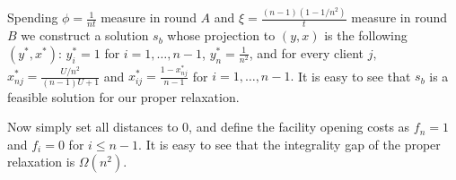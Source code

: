 \documentclass[11pt]{article}
\begin{document}
Spending $\phi=\frac{1}{nt}$ measure in round $A$ and $\xi=\frac{(n-1)(1-1/n^2)}{t}$ 
measure in round $B$ we construct a solution $s_b$ whose projection to $(y,x)$ is the 
following $(y^*,x^*)$:
$y^*_i=1$ for $i=1,\ldots ,n-1$, $y^*_n=\frac{1}{n^2}$, and for every client $j,$ $x^*_{nj}=\frac{U/n^2}{(n-1)U+1}$ and 
$x^*_{ij}=\frac{1-x^*_{nj}}{n-1}$ for $i=1,\ldots ,n-1.$ It is easy to see that $s_b$ is
a feasible solution for our proper relaxation.

Now simply set all distances to $0$, and define the facility opening costs as 
$f_n=1$ and $f_i=0$ for $i\leq n-1.$ It is easy to see
that the integrality gap of the proper relaxation is $\Omega (n^2)$. 
\end{document}
